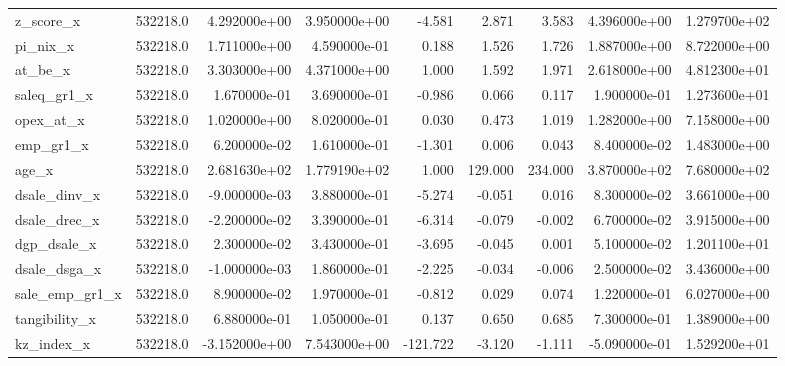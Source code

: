 \documentclass[12pt]{article}
\begin{document}
{\begin{landscape}
\begin{longtable}{|l|r|r|r|r|r|r|r|r|}
z\_score\_x              &  532218.0 &  4.292000e+00 &  3.950000e+00 &      -4.581 &        2.871 &        3.583 &  4.396000e+00 &  1.279700e+02 \\
pi\_nix\_x               &  532218.0 &  1.711000e+00 &  4.590000e-01 &       0.188 &        1.526 &        1.726 &  1.887000e+00 &  8.722000e+00 \\
at\_be\_x                &  532218.0 &  3.303000e+00 &  4.371000e+00 &       1.000 &        1.592 &        1.971 &  2.618000e+00 &  4.812300e+01 \\
saleq\_gr1\_x            &  532218.0 &  1.670000e-01 &  3.690000e-01 &      -0.986 &        0.066 &        0.117 &  1.900000e-01 &  1.273600e+01 \\
opex\_at\_x              &  532218.0 &  1.020000e+00 &  8.020000e-01 &       0.030 &        0.473 &        1.019 &  1.282000e+00 &  7.158000e+00 \\
emp\_gr1\_x              &  532218.0 &  6.200000e-02 &  1.610000e-01 &      -1.301 &        0.006 &        0.043 &  8.400000e-02 &  1.483000e+00 \\
age\_x                  &  532218.0 &  2.681630e+02 &  1.779190e+02 &       1.000 &      129.000 &      234.000 &  3.870000e+02 &  7.680000e+02 \\
dsale\_dinv\_x           &  532218.0 & -9.000000e-03 &  3.880000e-01 &      -5.274 &       -0.051 &        0.016 &  8.300000e-02 &  3.661000e+00 \\
dsale\_drec\_x           &  532218.0 & -2.200000e-02 &  3.390000e-01 &      -6.314 &       -0.079 &       -0.002 &  6.700000e-02 &  3.915000e+00 \\
dgp\_dsale\_x            &  532218.0 &  2.300000e-02 &  3.430000e-01 &      -3.695 &       -0.045 &        0.001 &  5.100000e-02 &  1.201100e+01 \\
dsale\_dsga\_x           &  532218.0 & -1.000000e-03 &  1.860000e-01 &      -2.225 &       -0.034 &       -0.006 &  2.500000e-02 &  3.436000e+00 \\
sale\_emp\_gr1\_x         &  532218.0 &  8.900000e-02 &  1.970000e-01 &      -0.812 &        0.029 &        0.074 &  1.220000e-01 &  6.027000e+00 \\
tangibility\_x          &  532218.0 &  6.880000e-01 &  1.050000e-01 &       0.137 &        0.650 &        0.685 &  7.300000e-01 &  1.389000e+00 \\
kz\_index\_x             &  532218.0 & -3.152000e+00 &  7.543000e+00 &    -121.722 &       -3.120 &       -1.111 & -5.090000e-01 &  1.529200e+01 \\

\end{longtable}
\end{landscape}}
\end{document}
